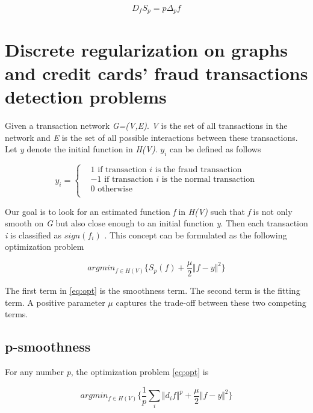 \begin{equation}
D_{f}S_{p}=p \Delta _{p}f
\end{equation}


\section{Discrete regularization on graphs and credit cards’ fraud transactions detection problems}

Given a transaction network \textit{G=(V,E)}. \textit{V} is the set of all transactions in the network and \textit{E} is the set of all possible interactions between these transactions. Let \textit{y} denote the initial function in \textit{H(V)}.  \( y_{i} \) \textit{ }can be defined as follows

$$
y_{i} = \begin{cases}

 & 1 \text{ if transaction } i \text{ is the fraud transaction} \\ 
 & -1 \text{ if transaction } i \text{ is the normal transaction} \\
 & 0 \text{ otherwise} \\

\end{cases}
$$

Our goal is to look for an estimated function \textit{f} in \textit{H(V)} such that \textit{f} is not only smooth on \textit{G} but also close enough to an initial function \textit{y}. Then each transaction \textit{i} is classified as  \( sign \left( f_{i} \right)  \) . This concept can be formulated as the following optimization problem


\begin{equation}
\label{eq:opt}
argmin_{f \in H \left( V \right) } \{ S_{p} \left( f \right) +\frac{ \mu }{2} \Vert f-y \Vert ^{2} \} 
\end{equation}


The first term in \ref{eq:opt} is the smoothness term. The second term is the fitting term. A positive parameter  \(  \mu  \)  captures the trade-off between these two competing terms.


\subsection{p-smoothness}

For any number \textit{p}, the optimization problem \ref{eq:opt} is 


\begin{equation}
\label{eq:p_smoothness}
argmin_{f \in H \left( V \right) } \{ \frac{1}{p} \sum _{i}^{} \Vert d_{i}f \Vert ^{p}+\frac{ \mu }{2} \Vert f-y \Vert ^{2} \}
\end{equation}


